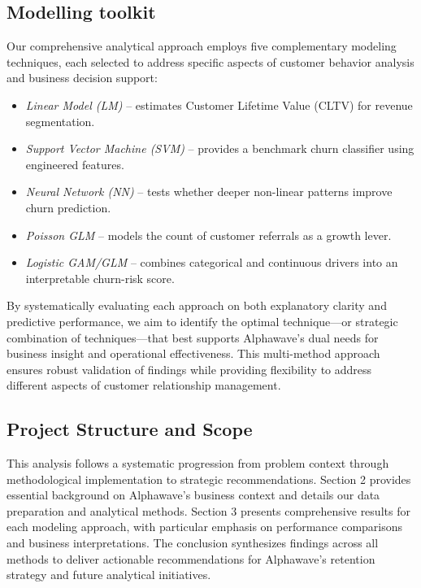 \documentclass[
]{article}
\providecommand{\tightlist}{%
  \setlength{\itemsep}{0pt}\setlength{\parskip}{0pt}}
\begin{document}
\hypertarget{modelling-toolkit}{%
\subsection{Modelling toolkit}\label{modelling-toolkit}}

Our comprehensive analytical approach employs five complementary
modeling techniques, each selected to address specific aspects of
customer behavior analysis and business decision support:

\begin{itemize}
\tightlist
\item
  \emph{Linear Model (LM)} -- estimates Customer Lifetime Value (CLTV)
  for revenue segmentation.\\
\item
  \emph{Support Vector Machine (SVM)} -- provides a benchmark churn
  classifier using engineered features.\\
\item
  \emph{Neural Network (NN)} -- tests whether deeper non-linear patterns
  improve churn prediction.\\
\item
  \emph{Poisson GLM} -- models the count of customer referrals as a
  growth lever.\\
\item
  \emph{Logistic GAM/GLM} -- combines categorical and continuous drivers
  into an interpretable churn-risk score.
\end{itemize}

By systematically evaluating each approach on both explanatory clarity
and predictive performance, we aim to identify the optimal
technique---or strategic combination of techniques---that best supports
Alphawave's dual needs for business insight and operational
effectiveness. This multi-method approach ensures robust validation of
findings while providing flexibility to address different aspects of
customer relationship management.

\hypertarget{project-structure-and-scope}{%
\subsection{Project Structure and
Scope}\label{project-structure-and-scope}}

This analysis follows a systematic progression from problem context
through methodological implementation to strategic recommendations.
Section 2 provides essential background on Alphawave's business context
and details our data preparation and analytical methods. Section 3
presents comprehensive results for each modeling approach, with
particular emphasis on performance comparisons and business
interpretations. The conclusion synthesizes findings across all methods
to deliver actionable recommendations for Alphawave's retention strategy
and future analytical initiatives.
\end{document}
